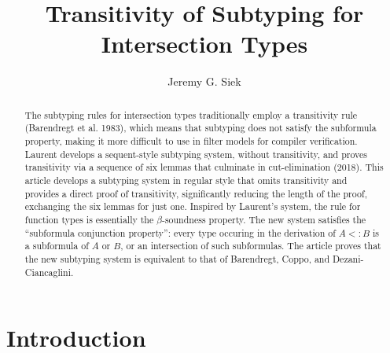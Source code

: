 \documentclass{article}
\title{Transitivity of Subtyping for Intersection Types}
\author{Jeremy G. Siek}
\begin{document}
\maketitle

\newcommand{\TOP}{\ensuremath{\mathtt{U}}}
\newcommand{\dom}[1]{\cap\mathsf{dom}(#1)}
\newcommand{\cod}[1]{\cap\mathsf{cod}(#1)}
\newcommand{\topP}[1]{\mathsf{top}(#1)}
\newcommand{\topInCod}[1]{\mathsf{topInCod}(#1)}
\newcommand{\depth}[1]{\mathsf{depth}(#1)}
\newcommand{\size}[1]{\mathsf{size}(#1)}
\newcommand{\inside}[0]{\inplus}
\newcommand{\containedin}[0]{\subsetpluseq}


\begin{abstract}
  The subtyping rules for intersection types traditionally employ a
  transitivity rule (Barendregt et al. 1983), which means that
  subtyping does not satisfy the subformula property, making it more
  difficult to use in filter models for compiler verification.
  Laurent develops a sequent-style subtyping system, without
  transitivity, and proves transitivity via a sequence of six lemmas
  that culminate in cut-elimination (2018). This article develops a
  subtyping system in regular style that omits transitivity and
  provides a direct proof of transitivity, significantly reducing the
  length of the proof, exchanging the six lemmas for just
  one. Inspired by Laurent's system, the rule for function types is
  essentially the $\beta$-soundness property.  The new system
  satisfies the ``subformula conjunction property'': every type
  occuring in the derivation of $A <: B$ is a subformula of $A$ or
  $B$, or an intersection of such subformulas. The article proves that
  the new subtyping system is equivalent to that of Barendregt, Coppo,
  and Dezani-Ciancaglini.
\end{abstract}

\section{Introduction}
\end{document}
